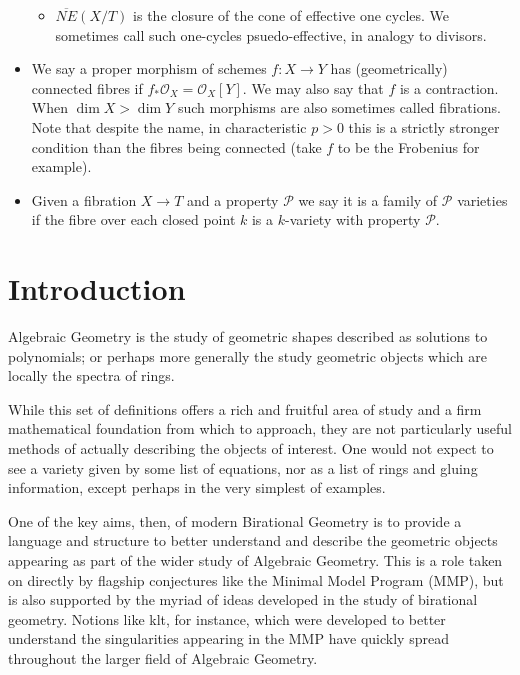 \documentclass[a4paper,12pt]{book}
\newcommand{\ox}{\mathcal{O}_{X}}
\begin{document}
\begin{itemize}
\begin{itemize}
			\item $\overline{NE}(X/T)$ is the closure of the cone of effective one cycles. We sometimes call such one-cycles psuedo-effective, in analogy to divisors.
		\end{itemize}
		\item We say a proper morphism of schemes $f:X \to Y$ has (geometrically) connected fibres if $f_{*}\ox=\ox[Y]$. We may also say that $f$ is a contraction. When $\dim X > \dim Y$ such morphisms are also sometimes called fibrations. Note that despite the name, in characteristic $p>0$ this is a strictly stronger condition than the fibres being connected (take $f$ to be the Frobenius for example).
		\item Given a fibration $X \to T$ and a property $\mathcal{P}$ we say it is a family of $\mathcal{P}$ varieties if the fibre over each closed point $k$ is a $k$-variety with property $\mathcal{P}$.
		
		
		
	\end{itemize}
	
	\chapter{Introduction}

	Algebraic Geometry is the study of geometric shapes described as solutions to polynomials; or perhaps more generally the study geometric objects which are locally the spectra of rings.
	
	While this set of definitions offers a rich and fruitful area of study and a firm mathematical foundation from which to approach, they are not particularly useful methods of actually describing the objects of interest. One would not expect to see a variety given by some list of equations, nor as a list of rings and gluing information, except perhaps in the very simplest of examples.
	
	One of the key aims, then, of modern Birational Geometry is to provide a language and structure to better understand and describe the geometric objects appearing as part of the wider study of Algebraic Geometry. This is a role taken on directly by flagship conjectures like the Minimal Model Program (MMP), but is also supported by the myriad of ideas developed in the study of birational geometry. Notions like klt, for instance, which were developed to better understand the singularities appearing in the MMP have quickly spread throughout the larger field of Algebraic Geometry.
	
\end{document}
